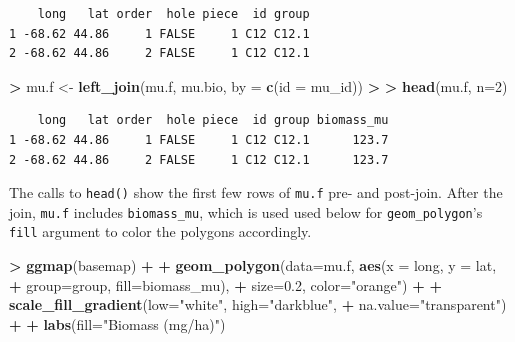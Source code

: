 \documentclass[
]{krantz}
\makeatletter
\newenvironment{Shaded}{\begin{snugshade}}{\end{snugshade}}
\newcommand{\DataTypeTok}[1]{\textcolor[rgb]{0.27,0.27,0.27}{#1}}
\newcommand{\DecValTok}[1]{\textcolor[rgb]{0.06,0.06,0.06}{#1}}
\newcommand{\ErrorTok}[1]{\textcolor[rgb]{0.14,0.14,0.14}{\textbf{#1}}}
\newcommand{\FloatTok}[1]{\textcolor[rgb]{0.06,0.06,0.06}{#1}}
\newcommand{\KeywordTok}[1]{\textcolor[rgb]{0.27,0.27,0.27}{\textbf{#1}}}
\newcommand{\NormalTok}[1]{#1}
\newcommand{\OperatorTok}[1]{\textcolor[rgb]{0.43,0.43,0.43}{\textbf{#1}}}
\newcommand{\StringTok}[1]{\textcolor[rgb]{0.5,0.5,0.5}{#1}}
\newenvironment{kframe}{%
\medskip{}
\setlength{\fboxsep}{.8em}
 \def\at@end@of@kframe{}%
 \ifinner\ifhmode%
  \def\at@end@of@kframe{\end{minipage}}%
  \begin{minipage}{\columnwidth}%
 \fi\fi%
 \def\FrameCommand##1{\hskip\@totalleftmargin \hskip-\fboxsep
 \colorbox{shadecolor}{##1}\hskip-\fboxsep
     \hskip-\linewidth \hskip-\@totalleftmargin \hskip\columnwidth}%
 \MakeFramed {\advance\hsize-\width
   \@totalleftmargin\z@ \linewidth\hsize
   \@setminipage}}%
 {\par\unskip\endMakeFramed%
 \at@end@of@kframe}
\renewenvironment{Shaded}{\begin{kframe}}{\end{kframe}}
\makeatother
\begin{document}
\begin{verbatim}
    long   lat order  hole piece  id group
1 -68.62 44.86     1 FALSE     1 C12 C12.1
2 -68.62 44.86     2 FALSE     1 C12 C12.1
\end{verbatim}

\begin{Shaded}
\begin{Highlighting}[]
\OperatorTok{\textgreater{}}\StringTok{ }\NormalTok{mu.f \textless{}{-}}\StringTok{ }\KeywordTok{left\_join}\NormalTok{(mu.f, mu.bio, }\DataTypeTok{by =} \KeywordTok{c}\NormalTok{(}\StringTok{\textquotesingle{}id\textquotesingle{}}\NormalTok{ =}\StringTok{ \textquotesingle{}mu\_id\textquotesingle{}}\NormalTok{))}
\OperatorTok{\textgreater{}}\StringTok{ }
\ErrorTok{\textgreater{}}\StringTok{ }\KeywordTok{head}\NormalTok{(mu.f, }\DataTypeTok{n=}\DecValTok{2}\NormalTok{)}
\end{Highlighting}
\end{Shaded}

\begin{verbatim}
    long   lat order  hole piece  id group biomass_mu
1 -68.62 44.86     1 FALSE     1 C12 C12.1      123.7
2 -68.62 44.86     2 FALSE     1 C12 C12.1      123.7
\end{verbatim}

The calls to \texttt{head()} show the first few rows of \texttt{mu.f} pre- and post-join. After the join, \texttt{mu.f} includes \texttt{biomass\_mu}, which is used used below for \texttt{geom\_polygon}'s \texttt{fill} argument to color the polygons accordingly.

\begin{Shaded}
\begin{Highlighting}[]
\OperatorTok{\textgreater{}}\StringTok{ }\KeywordTok{ggmap}\NormalTok{(basemap) }\OperatorTok{+}
\OperatorTok{+}\StringTok{     }\KeywordTok{geom\_polygon}\NormalTok{(}\DataTypeTok{data=}\NormalTok{mu.f, }\KeywordTok{aes}\NormalTok{(}\DataTypeTok{x =}\NormalTok{ long, }\DataTypeTok{y =}\NormalTok{ lat, }
\OperatorTok{+}\StringTok{                                 }\DataTypeTok{group=}\NormalTok{group, }\DataTypeTok{fill=}\NormalTok{biomass\_mu), }
\OperatorTok{+}\StringTok{                  }\DataTypeTok{size=}\FloatTok{0.2}\NormalTok{, }\DataTypeTok{color=}\StringTok{"orange"}\NormalTok{) }\OperatorTok{+}
\OperatorTok{+}\StringTok{     }\KeywordTok{scale\_fill\_gradient}\NormalTok{(}\DataTypeTok{low=}\StringTok{"white"}\NormalTok{, }\DataTypeTok{high=}\StringTok{"darkblue"}\NormalTok{, }
\OperatorTok{+}\StringTok{                         }\DataTypeTok{na.value=}\StringTok{"transparent"}\NormalTok{) }\OperatorTok{+}
\OperatorTok{+}\StringTok{     }\KeywordTok{labs}\NormalTok{(}\DataTypeTok{fill=}\StringTok{"Biomass (mg/ha)"}\NormalTok{)}
\end{Highlighting}
\end{Shaded}
\end{document}
